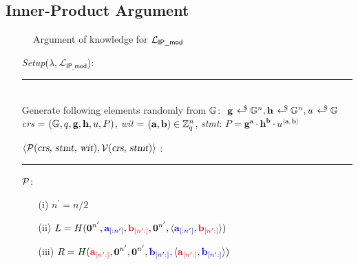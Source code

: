 \newpage
\subsection{Inner-Product Argument}
\label{subsec:iipa/ipa}

\begin{figure}[h!]
    \caption{Argument of knowledge for $\L_{\textsf{IP\_mod}}$}
    \label{fig:algo1}
\end{figure}
\begin{mdframed}[skipabove=\topsep]
    \begin{itemize}[itemsep=4pt]
        \item[] \textsl{Setup}($\lambda, \mathcal{L}_{\textsf{IP\_mod}}$):
        \\[-5pt]\rule{\textwidth}{0.4pt}\\ 
        Generate following elements randomly from $\G$: $\ \textbf{g} \rgen \G^{n}, \textbf{h} \rgen \G^n, u \rgen \G$
        \\[2pt]
        \textsl{crs} = $(\G, q, \textbf{g}, \textbf{h}, u, P)$, \textsl{wit} = $(\textbf{a}, \textbf{b}) \in \Z_q^n$, \textsl{stmt}: $P = \textbf{g}^\textbf{a} \cdot \textbf{h}^\textbf{b} \cdot u^{\langle \textbf{a},\textbf{b} \rangle}$
        \vspace{2pt}
    
        \item[] $\langle \mathcal{P}(\textsl{crs, stmt, wit}), \mathcal{V}(\textsl{crs, stmt}) \rangle$ :
        \\[-5pt]\rule{\textwidth}{0.4pt}
    
        \vspace{-4pt}
        \item[] $\P$:\vspace{-4pt}
        \begin{enumerate}[itemsep=5pt]
            \item[(i)] $n^{\prime} = n/2$ 
            
            \item[(ii)] $L = H(\textbf{0}^{n^{\prime}}, 
            \textcolor{blue}{\textbf{a}_{[:n^{\prime}]}},
            \textcolor{red}{\textbf{b}_{[n^{\prime}:]}},
            \textbf{0}^{n^{\prime}},
            \langle \textcolor{blue}{\textbf{a}_{[:n^{\prime}]}},
            \textcolor{red}{\textbf{b}_{[n^{\prime}:]}}
            \rangle)$

            \item[(iii)] $R = H(\textcolor{red}{\textbf{a}_{[n^{\prime}:]}},
            \textbf{0}^{n^{\prime}}, 
            \textbf{0}^{n^{\prime}},
            \textcolor{blue}{\textbf{b}_{[n^{\prime}:]}},
            \langle \textcolor{red}{\textbf{a}_{[n^{\prime}:]}},
            \textcolor{blue}{\textbf{b}_{[n^{\prime}:]}}
            \rangle)$
        \end{enumerate}
      

\end{itemize}
\end{mdframed}
